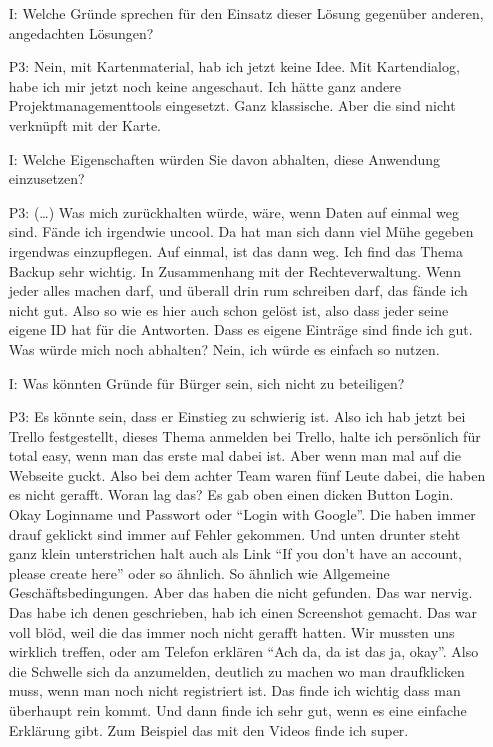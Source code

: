 \begin{itemize}
    \item[I:] Welche Gr{\"u}nde sprechen f{\"u}r den Einsatz dieser L{\"o}sung gegen{\"u}ber anderen, angedachten L{\"o}sungen?
    \item[P3:] Nein, mit Kartenmaterial, hab ich jetzt keine Idee. Mit Kartendialog, habe ich mir jetzt noch keine angeschaut. Ich h{\"a}tte ganz andere Projektmanagementtools eingesetzt. Ganz klassische. Aber die sind nicht verkn{\"u}pft mit der Karte.
    \item[I:] Welche Eigenschaften w{\"u}rden Sie davon abhalten, diese Anwendung einzusetzen?
    \item[P3:] (\dots) Was mich zur{\"u}ckhalten w{\"u}rde, w{\"a}re, wenn Daten auf einmal weg sind. F{\"a}nde ich irgendwie uncool. Da hat man sich dann viel M{\"u}he gegeben irgendwas einzupflegen. Auf einmal, ist das dann weg. Ich find das Thema Backup sehr wichtig. In Zusammenhang mit der Rechteverwaltung. Wenn jeder alles machen darf, und {\"u}berall drin rum schreiben darf, das f{\"a}nde ich nicht gut. Also so wie es hier auch schon gel{\"o}st ist, also dass jeder seine eigene ID hat f{\"u}r die Antworten. Dass es eigene Eintr{\"a}ge sind finde ich gut. Was w{\"u}rde mich noch abhalten? Nein, ich w{\"u}rde es einfach so nutzen.
    \item[I:] Was k{\"o}nnten Gr{\"u}nde f{\"u}r B{\"u}rger sein, sich nicht zu beteiligen?
    \item[P3:] Es k{\"o}nnte sein, dass er Einstieg zu schwierig ist. Also ich hab jetzt bei Trello festgestellt, dieses Thema anmelden bei Trello, halte ich pers{\"o}nlich f{\"u}r total easy, wenn man das erste mal dabei ist. Aber wenn man mal auf die Webseite guckt. Also bei dem achter Team waren f{\"u}nf Leute dabei, die haben es nicht gerafft. Woran lag das? Es gab oben einen dicken Button Login. Okay Loginname und Passwort oder "`Login with Google"'. Die haben immer drauf geklickt sind immer auf Fehler gekommen. Und unten drunter steht ganz klein unterstrichen halt auch als Link "`If you don't have an account, please create here"' oder so {\"a}hnlich. So {\"a}hnlich wie Allgemeine Gesch{\"a}ftsbedingungen. Aber das haben die nicht gefunden. Das war nervig. Das habe ich denen geschrieben, hab ich einen Screenshot gemacht. Das war voll bl{\"o}d, weil die das immer noch nicht gerafft hatten. Wir mussten uns wirklich treffen, oder am Telefon erkl{\"a}ren "`Ach da, da ist das ja, okay"'. Also die Schwelle sich da anzumelden, deutlich zu machen wo man draufklicken muss, wenn man noch nicht registriert ist. Das finde ich wichtig dass man {\"u}berhaupt rein kommt. Und dann finde ich sehr gut, wenn es eine einfache Erkl{\"a}rung gibt. Zum Beispiel das mit den Videos finde ich super.
\end{itemize}

